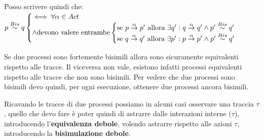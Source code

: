 Posso scrivere quindi che: 
$p\stackrel{Bis}{\sim} q 
    \begin{cases}
         \iff \forall\alpha\in Act \\
         \land \textnormal{devono valere entrambe}\begin{cases}
             \textnormal{se } p\stackrel{\alpha}{\rightarrow}p' \mbox{ allora } \exists q':
             q\stackrel{\alpha}{\rightarrow}q'\land p'\stackrel{Bis}{\sim}q' \\
             \textnormal{se } q\stackrel{\alpha}{\rightarrow}q' \mbox{ allora } \exists p': p\stackrel{\alpha}{\rightarrow}p'\land p'\stackrel{Bis}{\sim}q'
         \end{cases}
    \end{cases}
$

Se due processi sono fortemente bisimili allora sono sicuramente equivalenti rispetto alle tracce. Il viceversa non vale, esistono infatti processi equivalenti rispetto alle tracce che non sono bisimili.  Per vedere che due processi sono bisimili devo quindi, per ogni esecuzione, ottenere due processi ancora bisimili.


Ricavando le tracce di due processi possiamo in alcuni casi osservare una traccia $\tau$, quello che devo fare è poter quindi di astrarre dalle interazioni interne ($\tau$), introducendo l'\textbf{equivalenza debole}, volendo astrarre rispetto alle azioni $\tau$, introducendo la \textbf{bisimulazione debole}.